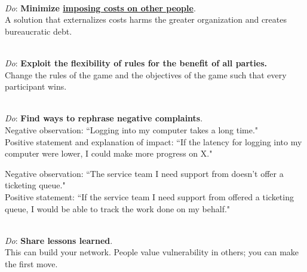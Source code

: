 \ \\
\textit{Do}: \textbf{Minimize \href{https://en.wikipedia.org/wiki/Externality}{imposing costs on other people}}.\\
\iftoggle{WPinmargin}{\marginpar{$>$Wikipedia: externality}}{}
A solution that externalizes costs harms the greater organization and creates bureaucratic debt.

\ \\
\textit{Do}: \textbf{Exploit the flexibility of rules for the benefit of all parties.}\\
Change the rules of the game and the objectives of the game such that every participant wins.


\ \\
\textit{Do}: \textbf{Find ways to rephrase negative complaints}.\\
Negative observation: ``Logging into my computer takes a long time."\\
Positive statement and explanation of impact: ``If the latency for logging into my computer were lower, I could make more progress on X."


Negative observation: ``The service team I need support from doesn't offer a ticketing queue."\\
Positive statement: ``If the service team I need support from offered a ticketing queue, I would be able to track the work done on my behalf."

\ \\
\textit{Do}: \textbf{Share lessons learned}.\\
This can build your network. People value vulnerability in others; you can make the first move. 